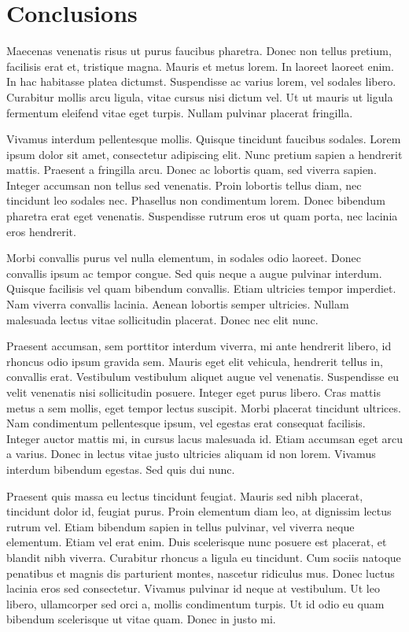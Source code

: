 \chapter{Conclusions}
\label{chp:conclusions}

Maecenas venenatis risus ut purus faucibus pharetra. Donec non tellus pretium, facilisis erat et, tristique magna. Mauris et metus lorem. In laoreet laoreet enim. In hac habitasse platea dictumst. Suspendisse ac varius lorem, vel sodales libero. Curabitur mollis arcu ligula, vitae cursus nisi dictum vel. Ut ut mauris ut ligula fermentum eleifend vitae eget turpis. Nullam pulvinar placerat fringilla.

Vivamus interdum pellentesque mollis. Quisque tincidunt faucibus sodales. Lorem ipsum dolor sit amet, consectetur adipiscing elit. Nunc pretium sapien a hendrerit mattis. Praesent a fringilla arcu. Donec ac lobortis quam, sed viverra sapien. Integer accumsan non tellus sed venenatis. Proin lobortis tellus diam, nec tincidunt leo sodales nec. Phasellus non condimentum lorem. Donec bibendum pharetra erat eget venenatis. Suspendisse rutrum eros ut quam porta, nec lacinia eros hendrerit.

Morbi convallis purus vel nulla elementum, in sodales odio laoreet. Donec convallis ipsum ac tempor congue. Sed quis neque a augue pulvinar interdum. Quisque facilisis vel quam bibendum convallis. Etiam ultricies tempor imperdiet. Nam viverra convallis lacinia. Aenean lobortis semper ultricies. Nullam malesuada lectus vitae sollicitudin placerat. Donec nec elit nunc.

Praesent accumsan, sem porttitor interdum viverra, mi ante hendrerit libero, id rhoncus odio ipsum gravida sem. Mauris eget elit vehicula, hendrerit tellus in, convallis erat. Vestibulum vestibulum aliquet augue vel venenatis. Suspendisse eu velit venenatis nisi sollicitudin posuere. Integer eget purus libero. Cras mattis metus a sem mollis, eget tempor lectus suscipit. Morbi placerat tincidunt ultrices. Nam condimentum pellentesque ipsum, vel egestas erat consequat facilisis. Integer auctor mattis mi, in cursus lacus malesuada id. Etiam accumsan eget arcu a varius. Donec in lectus vitae justo ultricies aliquam id non lorem. Vivamus interdum bibendum egestas. Sed quis dui nunc.

Praesent quis massa eu lectus tincidunt feugiat. Mauris sed nibh placerat, tincidunt dolor id, feugiat purus. Proin elementum diam leo, at dignissim lectus rutrum vel. Etiam bibendum sapien in tellus pulvinar, vel viverra neque elementum. Etiam vel erat enim. Duis scelerisque nunc posuere est placerat, et blandit nibh viverra. Curabitur rhoncus a ligula eu tincidunt. Cum sociis natoque penatibus et magnis dis parturient montes, nascetur ridiculus mus. Donec luctus lacinia eros sed consectetur. Vivamus pulvinar id neque at vestibulum. Ut leo libero, ullamcorper sed orci a, mollis condimentum turpis. Ut id odio eu quam bibendum scelerisque ut vitae quam. Donec in justo mi.


